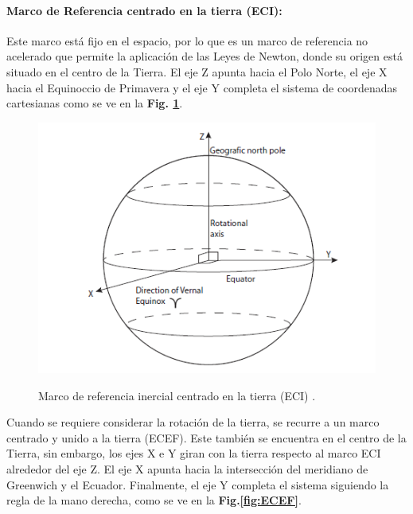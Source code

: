 \paragraph{Marco de Referencia centrado en la tierra (ECI):}Este marco está fijo en el espacio, por lo que es un marco de referencia no acelerado que permite la aplicación de las Leyes de Newton, donde su origen está situado en el centro de la Tierra. El eje Z apunta hacia el Polo Norte, el eje X hacia el Equinoccio de Primavera y el eje Y completa el sistema de coordenadas cartesianas como se ve en la \textbf{Fig. \ref{fig:ECI}}.
 
 \begin{figure}[!ht]
 	\begin{center}
 		\includegraphics[scale=0.7]{imagenes/marco_teorico/ECI.PNG}\\
 	\end{center}
 	\caption{ Marco de referencia inercial centrado en la tierra (ECI) \cite{Andresen2005}.}
 	\label{fig:ECI}
 \end{figure}
 
Cuando se requiere considerar la rotación de la tierra, se recurre a un marco centrado y unido a la tierra (ECEF). Este también se encuentra en el centro de la Tierra, sin embargo, los ejes X e Y giran con la tierra respecto al marco ECI alrededor del eje Z. El eje X apunta hacia la intersección del meridiano de Greenwich y el Ecuador. Finalmente, el eje Y completa el sistema siguiendo la regla de la mano derecha, como se ve en la \textbf{Fig.\ref{fig:ECEF}}.


